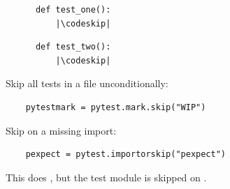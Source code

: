 \begin{minipage}{.49\linewidth}
    \begin{verbatim}
      def test_one():
          |\codeskip|
          \end{verbatim}
\end{minipage}
\begin{minipage}{.49\linewidth}
    \begin{verbatim}
      def test_two():
          |\codeskip|
    \end{verbatim}
\end{minipage}
\vspace{.75em}

Skip all tests in a file unconditionally:
\vspace{-.5em}

\begin{verbatim}
    pytestmark = pytest.mark.skip("WIP")
\end{verbatim}

Skip on a missing import:
\vspace{-.5em}

\begin{verbatim}
    pexpect = pytest.importorskip("pexpect")
\end{verbatim}

This does , but the test module is skipped on .
